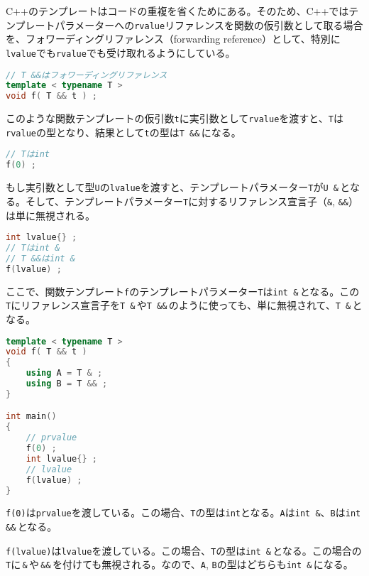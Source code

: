 
C++のテンプレートはコードの重複を省くためにある。そのため、C++ではテンプレートパラメーターへの\texttt{rvalue}リファレンスを関数の仮引数として取る場合を、フォワーディングリファレンス（forwarding reference）として、特別に\texttt{lvalue}でも\texttt{rvalue}でも受け取れるようにしている。

\begin{lstlisting}[language={C++}]
// T &&はフォワーディングリファレンス
template < typename T >
void f( T && t ) ;
\end{lstlisting}

このような関数テンプレートの仮引数\texttt{t}に実引数として\texttt{rvalue}を渡すと、\texttt{T}は\texttt{rvalue}の型となり、結果として\texttt{t}の型は\texttt{T \&\&}\,になる。

\begin{lstlisting}[language={C++}]
// Tはint
f(0) ;
\end{lstlisting}

もし実引数として型\texttt{U}の\texttt{lvalue}を渡すと、テンプレートパラメーター\texttt{T}が\texttt{U \&}\,となる。そして、テンプレートパラメーター\texttt{T}に対するリファレンス宣言子（\texttt{\&}, \texttt{\&\&}）は単に無視される。

\begin{lstlisting}[language={C++}]
int lvalue{} ;
// Tはint &
// T &&はint &
f(lvalue) ;
\end{lstlisting}

ここで、関数テンプレート\texttt{f}のテンプレートパラメーター\texttt{T}は\texttt{int \&}\,となる。この\texttt{T}にリファレンス宣言子を\texttt{T \&}\,や\texttt{T \&\&}\,のように使っても、単に無視されて、\texttt{T \&}\,となる。

\begin{lstlisting}[language={C++}]
template < typename T >
void f( T && t )
{
    using A = T & ;
    using B = T && ; 
}

int main()
{
    // prvalue
    f(0) ;
    int lvalue{} ;
    // lvalue
    f(lvalue) ;
}
\end{lstlisting}

\texttt{f(0)}は\texttt{prvalue}を渡している。この場合、\texttt{T}の型は\texttt{int}となる。\texttt{A}は\texttt{int \&}、\texttt{B}は\texttt{int \&\&}\,となる。

\texttt{f(lvalue)}は\texttt{lvalue}を渡している。この場合、\texttt{T}の型は\texttt{int \&}\,となる。この場合の\texttt{T}に\,\texttt{\&}\,や\,\texttt{\&\&}\,を付けても無視される。なので、\texttt{A}, \texttt{B}の型はどちらも\texttt{int \&}\,になる。

